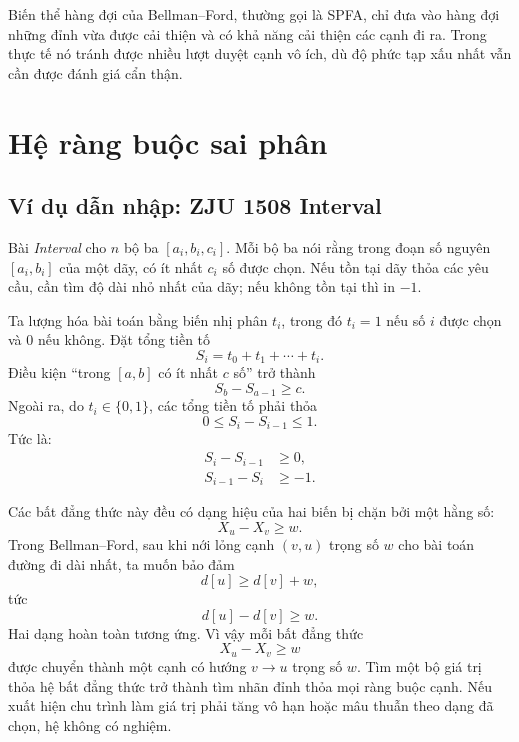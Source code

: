 \documentclass[11pt]{article}
\begin{document}
Biến thể hàng đợi của Bellman--Ford, thường gọi là SPFA, chỉ đưa vào hàng đợi
những đỉnh vừa được cải thiện và có khả năng cải thiện các cạnh đi ra. Trong
thực tế nó tránh được nhiều lượt duyệt cạnh vô ích, dù độ phức tạp xấu nhất
vẫn cần được đánh giá cẩn thận.

\section{Hệ ràng buộc sai phân}

\subsection{Ví dụ dẫn nhập: ZJU 1508 Interval}

Bài \textit{Interval} cho \(n\) bộ ba \([a_i,b_i,c_i]\). Mỗi bộ ba nói rằng
trong đoạn số nguyên \([a_i,b_i]\) của một dãy, có ít nhất \(c_i\) số được
chọn. Nếu tồn tại dãy thỏa các yêu cầu, cần tìm độ dài nhỏ nhất của dãy; nếu
không tồn tại thì in \(-1\).

Ta lượng hóa bài toán bằng biến nhị phân \(t_i\), trong đó \(t_i=1\) nếu số
\(i\) được chọn và \(0\) nếu không. Đặt tổng tiền tố
\[
  S_i=t_0+t_1+\cdots+t_i.
\]
Điều kiện ``trong \([a,b]\) có ít nhất \(c\) số'' trở thành
\[
  S_b-S_{a-1}\ge c.
\]
Ngoài ra, do \(t_i\in\{0,1\}\), các tổng tiền tố phải thỏa
\[
  0\le S_i-S_{i-1}\le 1.
\]
Tức là:
\[
\begin{aligned}
  S_i-S_{i-1}&\ge 0,\\
  S_{i-1}-S_i&\ge -1.
\end{aligned}
\]

Các bất đẳng thức này đều có dạng hiệu của hai biến bị chặn bởi một hằng số:
\[
  X_u-X_v\ge w.
\]
Trong Bellman--Ford, sau khi nới lỏng cạnh \((v,u)\) trọng số \(w\) cho bài
toán đường đi dài nhất, ta muốn bảo đảm
\[
  d[u]\ge d[v]+w,
\]
tức
\[
  d[u]-d[v]\ge w.
\]
Hai dạng hoàn toàn tương ứng. Vì vậy mỗi bất đẳng thức
\[
  X_u-X_v\ge w
\]
được chuyển thành một cạnh có hướng \(v\to u\) trọng số \(w\). Tìm một bộ giá
trị thỏa hệ bất đẳng thức trở thành tìm nhãn đỉnh thỏa mọi ràng buộc cạnh.
Nếu xuất hiện chu trình làm giá trị phải tăng vô hạn hoặc mâu thuẫn theo dạng
đã chọn, hệ không có nghiệm.
\end{document}
